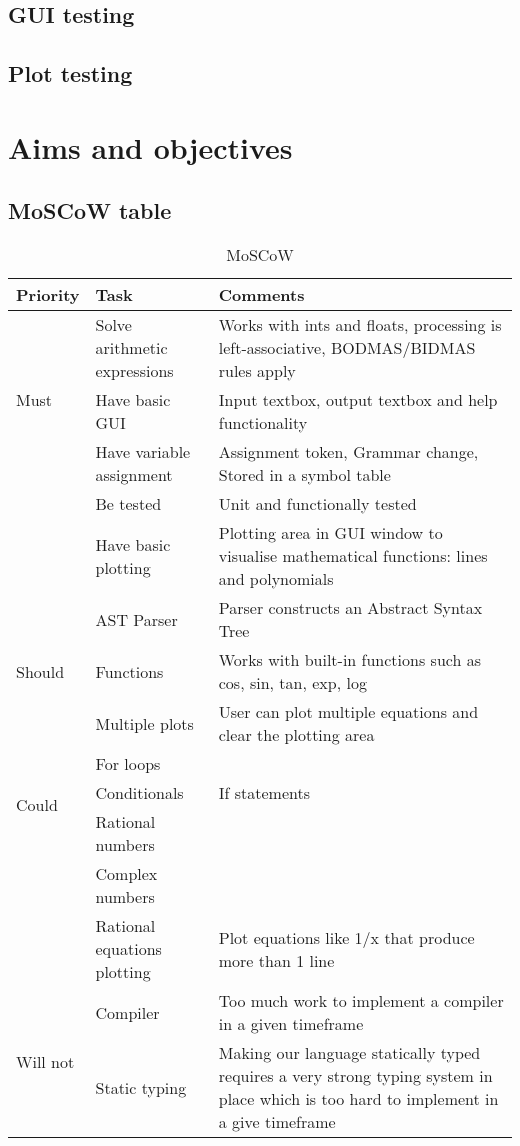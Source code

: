 \documentclass[a4paper, oneside, 11pt]{report}
\begin{document}
\section{GUI testing}

\section{Plot testing}

\chapter{Aims and objectives}
\section{MoSCoW table}
\label{appendix:moscow}
\begin{table}[h]
\caption{MoSCoW}
\begin{center}
\begin{tabular}{|p{1in}|p{2in}|p{2.5in}|} \hline
Priority & Task & Comments \\ \hline \hline
\multirow{3}{1in}{Must}
& Solve arithmetic expressions & Works with ints and floats, processing is left-associative, BODMAS/BIDMAS rules apply \\ \cline{2-3}
& Have basic GUI & Input textbox, output textbox and help functionality \\ \cline{2-3}
& Have variable assignment & Assignment token, Grammar change, Stored in a symbol table \\ \cline{2-3}
& Be tested & Unit and functionally tested \\ \cline{2-3}
& Have basic plotting & Plotting area in GUI window to visualise mathematical functions: lines and polynomials \\ \hline \hline
\multirow{3}{1in}{Should}
& AST Parser & Parser constructs an Abstract Syntax Tree \\ \cline{2-3}
& Functions & Works with built-in functions such as cos, sin, tan, exp, log  \\ \cline{2-3}
& Multiple plots & User can plot multiple equations and clear the plotting area \\ \hline \hline
\multirow{3}{1in}{Could}
& For loops & \\ \cline{2-3}
& Conditionals & If statements \\ \cline{2-3}
& Rational numbers & \\ \cline{2-3}
& Complex numbers & \\ \cline{2-3}
& Rational equations plotting & Plot equations like 1/x that produce more than 1 line \\ \hline \hline
\multirow{3}{1in}{Will not}
& Compiler & Too much work to implement a compiler in a given timeframe \\ \cline{2-3}
& Static typing & Making our language statically typed requires a very strong typing system in place which is too hard to implement in a give timeframe \\ \hline
\end{tabular}
\label{Table1}
\end{center}
\end{table}
\end{document}
